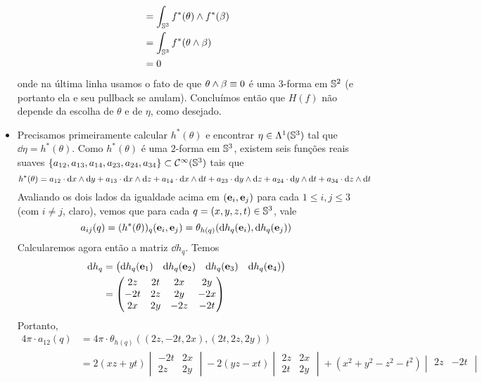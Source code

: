 \begin{dem}
\begin{itemize}
\begin{align*}
&=  \int_{\S^3} f^{*}(\theta)   \wedge f^{*}( \beta) \\
&= \int_{\S^3} f^{*}(\theta \wg \beta)  \\
&=0
\end{align*}
onde na última linha usamos o fato de que $\theta \wg \beta \equiv 0$ é uma $3$-forma em $\S^2$ (e portanto ela e seu pullback se anulam). Concluímos então que $H(f)$ não depende da escolha de $\theta$ e de $\eta$, como desejado.
\item Precisamos primeiramente calcular $h^{*}(\theta)$ e encontrar $\eta \in \Lambda^1(\S^3)$ tal que $\dd \eta =h^{*}(\theta)$. Como $h^{*}(\theta)$ é uma $2$-forma em $\S^3$, existem seis funções reais suaves $\{a_{12}, a_{13}, a_{14}, a_{23}, a_{24}, a_{34}\} \subset \mathcal{C}^{\infty}(\S^3)$ tais que
\[
h^{*}(\theta) = a_{12} \cdot \dd x \wg \dd y + a_{13} \cdot \dd x \wg \dd z + a_{14} \cdot \dd x \wg \dd t + a_{23} \cdot \dd y \wg \dd z + a_{24} \cdot \dd y \wg \dd t + a_{34} \cdot \dd z \wg \dd t
\]
Avaliando os dois lados da igualdade acima em $(\be_i, \be_j)$ para cada $1 \leq i, j \leq 3$ (com $i \neq j$, claro), vemos que para cada $q = (x, y, z, t) \in \S^3$, vale
\[
a_{ij}(q) = (h^{*}(\theta))_{q}(\be_i, \be_j) = \theta_{h(q)} (\dd h_{q}(\be_i), \dd h_{q} (\be_j)) 
\]
Calcularemos agora então a matriz $\dd h_{q}$. Temos
\[
\begin{aligned}
\dd h_q &= \begin{pmatrix}
\dd h_q(\be_1) & \dd h_q(\be_2) & \dd h_q(\be_3) & \dd h_q(\be_4) 
\end{pmatrix} \\
&= \begin{pmatrix}
2z & 2t & 2x & 2y \\
-2t & 2z & 2y & -2x \\
2x & 2y & - 2z & - 2t 
\end{pmatrix}
\end{aligned}
\]
Portanto, 
\begin{align*}
4\pi \cdot a_{12}(q) &= 4\pi \cdot \theta_{h(q)}((2z, -2t, 2x), (2t, 2z, 2y)) \\
&= 2(xz + yt) \begin{vmatrix}
-2t & 2x \\
2z & 2y 
\end{vmatrix} - 2(yz - xt) \begin{vmatrix}
2z & 2x \\
2t & 2y
\end{vmatrix} + (x^2 + y^2 - z^2 - t^2) \begin{vmatrix}
2z & -2t \\ 

\end{vmatrix}
\end{align*}
\end{itemize}
\end{dem}
